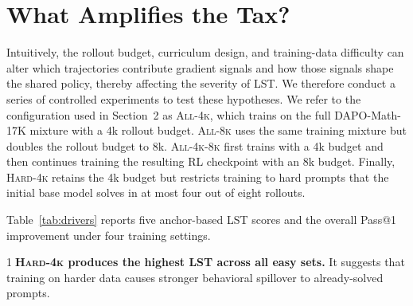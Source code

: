 \documentclass{article} %
\begin{document}

\section{What Amplifies the Tax?}
\label{sec:diagnosis}

Intuitively, the rollout budget, curriculum design, and training-data difficulty can alter which trajectories contribute gradient signals and how those signals shape the shared policy, thereby affecting the severity of LST. We therefore conduct a series of controlled experiments to test these hypotheses. We refer to the configuration used in Section~2 as \textsc{All-4k}, which trains on the full DAPO-Math-17K mixture with a 4k rollout budget. \textsc{All-8k} uses the same training mixture but doubles the rollout budget to 8k. \textsc{All-4k-8k} first trains with a 4k budget and then continues training the resulting RL checkpoint with an 8k budget. Finally, \textsc{Hard-4k} retains the 4k budget but restricts training to hard prompts that the initial base model solves in at most four out of eight rollouts.



Table~\ref{tab:drivers} reports five anchor-based LST scores and the overall Pass@1 improvement under four training settings.

\noindent\textcircled{\small 1}\enspace\textbf{\textsc{Hard-4k} produces the highest LST across all easy sets.} It suggests that training on harder data causes stronger behavioral spillover to already-solved prompts.
\end{document}
